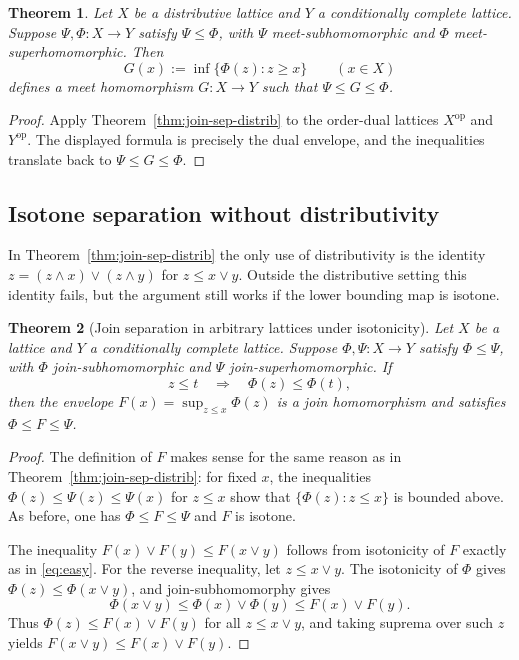 \documentclass[11pt]{amsart}
\newtheorem{theorem}{Theorem}[section]
\theoremstyle{definition}
\newcommand{\join}{\vee}
\newcommand{\meet}{\wedge}
\newcommand{\op}{\mathrm{op}}
\begin{document}
\begin{theorem}\label{thm:meet-sep-distrib}
Let $X$ be a distributive lattice and $Y$ a conditionally complete lattice.
Suppose $\Psi,\Phi\colon X\to Y$ satisfy $\Psi\le \Phi$, with $\Psi$ meet-subhomomorphic and $\Phi$ meet-superhomomorphic.
Then
\[
G(x):=\inf\{\Phi(z): z\ge x\}\qquad(x\in X)
\]
defines a meet homomorphism $G\colon X\to Y$ such that $\Psi\le G\le \Phi$.
\end{theorem}

\begin{proof}
Apply Theorem~\ref{thm:join-sep-distrib} to the order-dual lattices $X^{\op}$ and $Y^{\op}$.
The displayed formula is precisely the dual envelope, and the inequalities translate back to $\Psi\le G\le\Phi$.
\end{proof}

\subsection{Isotone separation without distributivity}
In Theorem~\ref{thm:join-sep-distrib} the only use of distributivity is the identity
$z=(z\meet x)\join(z\meet y)$ for $z\le x\join y$.
Outside the distributive setting this identity fails, but the argument still works if the lower bounding map is isotone.

\begin{theorem}[Join separation in arbitrary lattices under isotonicity]\label{thm:sep-isotone}
Let $X$ be a lattice and $Y$ a conditionally complete lattice.
Suppose $\Phi,\Psi\colon X\to Y$ satisfy $\Phi\le \Psi$, with $\Phi$ join-subhomomorphic and $\Psi$ join-superhomomorphic.
If
\[
 z\le t \quad\Longrightarrow\quad \Phi(z)\le \Phi(t),
\]
then the envelope $F(x)=\sup_{z\le x}\Phi(z)$ is a join homomorphism and satisfies $\Phi\le F\le \Psi$.
\end{theorem}

\begin{proof}
The definition of $F$ makes sense for the same reason as in Theorem~\ref{thm:join-sep-distrib}: for fixed $x$, the inequalities
$\Phi(z)\le \Psi(z)\le \Psi(x)$ for $z\le x$ show that $\{\Phi(z):z\le x\}$ is bounded above.
As before, one has $\Phi\le F\le \Psi$ and $F$ is isotone.

The inequality $F(x)\join F(y)\le F(x\join y)$ follows from isotonicity of $F$ exactly as in \eqref{eq:easy}.
For the reverse inequality, let $z\le x\join y$.
The isotonicity of $\Phi$ gives $\Phi(z)\le \Phi(x\join y)$, and join-subhomomorphy gives
\[
\Phi(x\join y)\le \Phi(x)\join\Phi(y)\le F(x)\join F(y).
\]
Thus $\Phi(z)\le F(x)\join F(y)$ for all $z\le x\join y$, and taking suprema over such $z$ yields $F(x\join y)\le F(x)\join F(y)$.
\end{proof}
\end{document}
